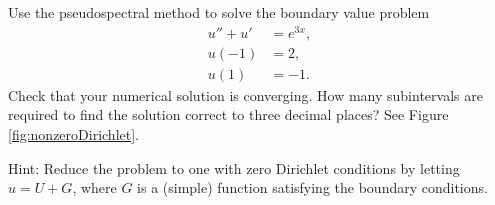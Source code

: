 \begin{problem}
Use the pseudospectral method to solve the boundary value problem 
\begin{align*}
u'' + u' &= e^{3x}, \\
u(-1) &= 2, \\
u(1) &= -1.
\end{align*}
Check that your numerical solution is converging.
How many subintervals are required to find the solution correct to three decimal places?
See Figure \ref{fig:nonzeroDirichlet}.
	
Hint: Reduce the problem to one with zero Dirichlet conditions by letting $u = U+G$, where $G$ is a (simple) function satisfying the boundary conditions.
\end{problem}


